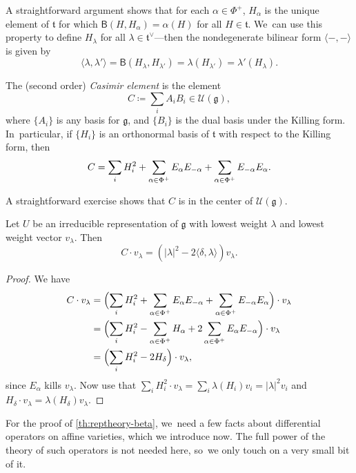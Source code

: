 A straightforward argument shows that for each $\alpha\in \Phi^+$, $H_\alpha$ is the unique element of $\mathfrak{t}$ for which $\mathsf{B}(H, H_\alpha) = \alpha(H)$ for all $H\in \mathfrak{t}$. We~can use this property to define $H_\lambda$ for all $\lambda\in \mathfrak{t}^\vee$---then the nondegenerate bilinear form $\langle-,-\rangle$ is given by
\[
\langle \lambda, \lambda'\rangle = \mathsf{B}(H_\lambda, H_{\lambda'}) = \lambda(H_{\lambda'}) = \lambda'(H_{\lambda}).
\]

\begin{dfn}
The (second order) \emph{Casimir element} is the element
\[
C\coloneqq \sum_i A_iB_i \in \mathcal{U}(\mathfrak{g}),
\]
where $\{A_i\}$ is any basis for $\mathfrak{g}$, and $\{B_i\}$ is the dual basis under the Killing form. In~particular, if $\{H_i\}$ is an orthonormal basis of $\mathfrak{t}$ with respect to the Killing form, then
\[
C = \sum_i H_i^2 + \sum_{\alpha\in\Phi^+} E_\alpha E_{-\alpha} + \sum_{\alpha\in\Phi^+} E_{-\alpha}E_{\alpha}.\qedhere
\]
\end{dfn}
A straightforward exercise
shows that $C$ is in the center of $\mathcal{U}(\mathfrak{g})$.

\begin{lem}\label{irred-rep-cas}
Let $U$ be an irreducible representation of $\mathfrak{g}$ with
lowest
weight $\lambda$ and
lowest
weight vector $v_\lambda$. Then
\[
C\cdot v_\lambda = \left(|\lambda|^2 - 2\langle\delta,\lambda\rangle\right)v_\lambda.
\]
\end{lem}

\begin{proof}
We have
\begin{align*}
C\cdot v_\lambda &= \Bigl(\sum_i H_i^2 + \sum_{\alpha\in\Phi^+} E_\alpha E_{-\alpha} + \sum_{\alpha\in\Phi^+} E_{-\alpha}E_{\alpha}\Bigr)\cdot v_\lambda\\
&= \Bigl(\sum_i H_i^2 - \sum_{\alpha\in\Phi^+} H_\alpha + 2\sum_{\alpha\in\Phi^+} E_{\alpha}E_{-\alpha}\Bigr)\cdot v_\lambda\\
&= \Bigl(\sum_i H_i^2 -2H_\delta\Bigr)\cdot v_\lambda,
\end{align*}
since $E_\alpha$ kills $v_\lambda$. Now use that $ \sum_i H_i^2\cdot v_\lambda = \sum_i \lambda(H_i)v_i = |\lambda|^2v_i$ and $H_\delta\cdot v_\lambda = \lambda(H_\delta)v_\lambda$.
\end{proof}

For the proof of \cref{th:reptheory-beta}, we~need
a few facts about differential operators on affine varieties, which we introduce now. The full power of the theory of such operators is not needed here, so~we only touch on a very small bit of it.

